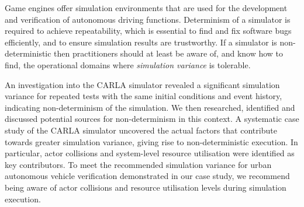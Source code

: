 \documentclass[runningheads,twocolumn,a4paper,10pt]{llncs}
\begin{document}

Game engines offer simulation environments that are used for the development and verification of autonomous driving functions. 
%
Determinism of a simulator is required to achieve repeatability, which is essential to find and fix software bugs efficiently, and to ensure simulation results are trustworthy. 
%
If a simulator is non-deterministic then practitioners should at least be aware of, and know how to find, the operational domains where \textit{simulation variance} is tolerable. 

An investigation into the CARLA simulator revealed a significant simulation variance for repeated tests with the same initial conditions and event history, indicating non-determinism of the simulation. 
%
We then researched, identified and discussed potential sources for non-determinism in this context.
%
A systematic case study of the CARLA simulator uncovered the actual factors that contribute towards greater simulation variance, giving rise to non-deterministic execution. In particular, actor collisions and system-level resource utilisation were identified as key contributors. 
%
To meet the recommended simulation variance for urban autonomous vehicle verification demonstrated in our case study, we recommend being aware of actor collisions and resource utilisation levels during simulation execution.  
%
\end{document}
